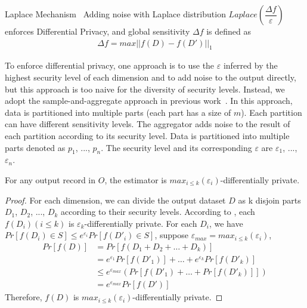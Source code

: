 \begin{theorem}{Laplace Mechanism~\cite{Dwork2006Differential}}
  Adding noise with Laplace distribution $Laplace(\dfrac{\Delta 
f}{\varepsilon})$ enforces
  Differential Privacy, and global sensitivity $\Delta f$ is defined as
  \vspace{-.1in}
  \begin{align}
    \Delta f = max || f(D) - f(D') ||_1
  \end{align}
\end{theorem}

To enforce differential privacy, one approach is to use the $\varepsilon$ 
inferred by the highest security level of each dimension and to add noise to 
the output directly, but this approach is too naive for the diversity of 
security levels. Instead, we adopt the sample-and-aggregate approach in 
previous work~\cite{differentialdp:stoc11}. In this approach, data is 
partitioned into multiple parts (each part has a size of $m$). Each partition 
can have different sensitivity levels. The aggregator adds noise to the 
result of each partition according to its security level. Data 
is partitioned into multiple parts denoted as $p_1$, ..., $p_n$.
The security level and its corresponding $\varepsilon$ are $\varepsilon_1$,
..., $\varepsilon_n$.

\begin{theorem}
  For any output record in $O$, the
  estimator is $max_{i \le k}(\varepsilon_i)$-differentially private.
\end{theorem}
\begin{proof}
  For each dimension, we can divide the output dataset $D$ as k disjoin parts 
$D_1$, $D_2$,
  ..., $D_k$ according to their security levels. According to 
\cite{pointestimation:smith08},
  each $f(D_i)(i \le k)$ is $\varepsilon_k$-differentially private.
  For each $D_i$, we have $Pr[f(D_i) \in S] \le e^{\varepsilon_i}Pr[f(D'_i) \in 
S]$, suppose $\varepsilon_{max} = max_{i \le k}(\varepsilon_i)$, \\
  \vspace{-0.1in}
  \begin{equation} \label{eq1}
  \begin{split}
  Pr[f(D)] & = Pr[f(D_1 + D_2 + \ldots + D_k)] \\
   & = e^{\varepsilon_1}Pr[f(D'_1)] + \ldots + e^{\varepsilon_k}Pr[f(D'_k)] \\
   & \le  e^{\varepsilon_{max}}(Pr[f(D'_1) + \ldots + Pr[f(D'_k)]]) \\
   & = e^{\varepsilon_{max}}Pr[f(D')]
  \end{split}
  \end{equation}
  Therefore, $f(D)$ is $max_{i \le k}(\varepsilon_i)$-differentially private.
\end{proof}

